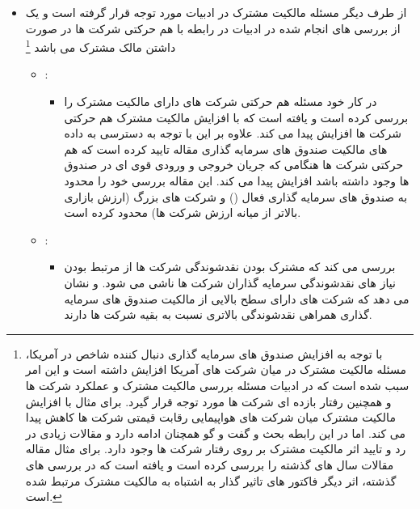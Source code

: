 \documentclass[12pt, a4paper]{article}
\begin{document}
\begin{itemize}
\item 
از طرف دیگر مسئله مالکیت مشترک در ادبیات مورد توجه قرار گرفته است و یک از بررسی های انجام شده در ادبیات در رابطه با هم حرکتی شرکت ها در صورت داشتن مالک مشترک می باشد
\footnote{
 با توجه به افزایش صندوق های سرمایه گذاری  دنبال کننده شاخص در آمریکا، مسئله مالکیت مشترک در میان شرکت های آمریکا افزایش داشته است و این امر سبب شده است که در ادبیات مسئله بررسی مالکیت مشترک و عملکرد شرکت ها و همچنین رفتار بازده ای شرکت ها مورد توجه قرار گیرد. 
برای مثال 
با افزایش مالکیت مشترک میان شرکت های هواپیمایی رقابت قیمتی شرکت ها کاهش پیدا می کند.  اما در این رابطه بحث و گفت و گو همچنان ادامه دارد و مقالات زیادی در رد و تایید اثر مالکیت مشترک بر روی رفتار شرکت ها وجود دارد. برای مثال مقاله
مقالات سال های گذشته را بررسی کرده است و یافته است که در بررسی های گذشته، اثر دیگر فاکتور های تاثیر گذار به اشتباه به مالکیت مشترک مرتبط شده است.
}
\begin{itemize}
\item {}:
\begin{itemize}
\item
در کار خود مسئله هم حرکتی شرکت های دارای مالکیت مشترک را بررسی کرده است و یافته است که با افزایش مالکیت مشترک هم حرکتی شرکت ها افزایش پیدا می کند. علاوه بر این با توجه به دسترسی به داده های مالکیت صندوق های سرمایه گذاری مقاله تایید کرده است که هم حرکتی شرکت ها هنگامی که جریان خروجی و ورودی قوی ای در صندوق ها وجود داشته باشد افزایش پیدا می کند. این مقاله بررسی خود را محدود به صندوق های سرمایه گذاری فعال 
() 
و شرکت های بزرگ (ارزش بازاری بالاتر از میانه ارزش شرکت ها) محدود کرده است.
\end{itemize}
\item {}:
\begin{itemize}
\item
بررسی می کند که مشترک بودن نقدشوندگی شرکت ها از مرتبط بودن نیاز های نقدشوندگی سرمایه گذاران شرکت ها ناشی می شود. و نشان می دهد که شرکت های دارای سطح بالایی از مالکیت صندوق های سرمایه گذاری همراهی نقدشوندگی بالاتری نسبت به بقیه شرکت ها دارند.
\end{itemize}
\end{itemize}


\end{itemize}


\end{document}
